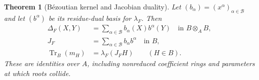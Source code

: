 \documentclass[11pt,letterpaper]{article}
\numberwithin{equation}{section}
\newtheorem{theorem}{Theorem}[section]
\theoremstyle{definition}
\theoremstyle{remark}\newtheorem{remark}[theorem]{Remark}
\newcommand{\Tr}{\operatorname{Tr}}
\begin{document}
\begin{theorem}[B\'ezoutian kernel and Jacobian duality]
\label{polynomial:thm:jacobian}
Let $(b_\alpha)=(x^\alpha)_{\alpha\in\mathcal B}$ and let $(b^\alpha)$ be its
residue-dual basis for $\lambda_F$. Then
\begin{align}
 \Delta_F(X,Y)&=\sum_{\alpha\in\mathcal B}b_\alpha(X)b^\alpha(Y)
 \quad\text{in }B\otimes_AB,\label{polynomial:eq:casimir}\\
 J_F&=\sum_{\alpha\in\mathcal B}b_\alpha b^\alpha\quad\text{in }B,
 \label{polynomial:eq:jacobianeuler}\\
 \Tr_B(m_H)&=\lambda_F(J_FH)\qquad(H\in B).
 \label{polynomial:eq:jacobiantrace}
\end{align}
These are identities over $A$, including nonreduced coefficient rings and
parameters at which roots collide.
\end{theorem}
\end{document}
